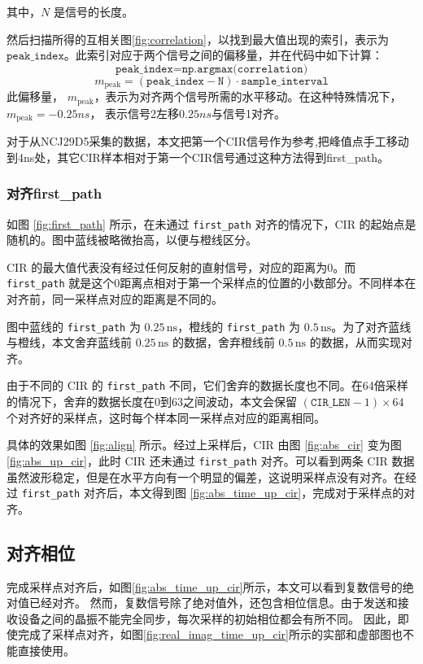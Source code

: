 其中，\( N \) 是信号的长度。

然后扫描所得的互相关图\ref{fig:correlation}，以找到最大值出现的索引，表示为 \( \texttt{peak\_index} \)。此索引对应于两个信号之间的偏移量，并在代码中如下计算：
\[
\texttt{peak\_index} = \texttt{np.argmax(correlation)}
\]
\[
m_{\text{peak}}  = (\texttt{peak\_index} - \texttt{N}) \cdot \texttt{sample\_interval}
\]
此偏移量， \( m_{\text{peak}} \)，表示为对齐两个信号所需的水平移动。在这种特殊情况下，\( m_{\text{peak}} = -0.25ns \)， 表示信号2左移\(0.25ns\)与信号1对齐。

对于从NCJ29D5采集的数据，本文把第一个CIR信号作为参考,把峰值点手工移动到4ns处，其它CIR样本相对于第一个CIR信号通过这种方法得到first\_path。


\subsubsection{对齐first\_path}
如图 \ref{fig:first_path} 所示，在未通过 \texttt{first\_path} 对齐的情况下，CIR 的起始点是随机的。图中蓝线被略微抬高，以便与橙线区分。

CIR 的最大值代表没有经过任何反射的直射信号，对应的距离为0。而 \texttt{first\_path} 就是这个0距离点相对于第一个采样点的位置的小数部分。不同样本在对齐前，同一采样点对应的距离是不同的。

图中蓝线的 \texttt{first\_path} 为 \(0.25\, \text{ns}\)，橙线的 \texttt{first\_path} 为 \(0.5\, \text{ns}\)。为了对齐蓝线与橙线，本文舍弃蓝线前 \(0.25\, \text{ns}\) 的数据，舍弃橙线前 \(0.5\, \text{ns}\) 的数据，从而实现对齐。

由于不同的 CIR 的 \texttt{first\_path} 不同，它们舍弃的数据长度也不同。在64倍采样的情况下，舍弃的数据长度在0到63之间波动，本文会保留 \((\texttt{CIR\_LEN}-1) \times 64\) 个对齐好的采样点，这时每个样本同一采样点对应的距离相同。

具体的效果如图 \ref{fig:align} 所示。经过上采样后，CIR 由图 \ref{fig:abs_cir} 变为图 \ref{fig:abs_up_cir}，此时 CIR 还未通过 \texttt{first\_path} 对齐。可以看到两条 CIR 数据虽然波形稳定，但是在水平方向有一个明显的偏差，这说明采样点没有对齐。在经过 \texttt{first\_path} 对齐后，本文得到图 \ref{fig:abs_time_up_cir}，完成对于采样点的对齐。

\subsection{对齐相位}
完成采样点对齐后，如图\ref{fig:abs_time_up_cir}所示，本文可以看到复数信号的绝对值已经对齐。
然而，复数信号除了绝对值外，还包含相位信息。由于发送和接收设备之间的晶振不能完全同步，每次采样的初始相位都会有所不同。
因此，即使完成了采样点对齐，如图\ref{fig:real_imag_time_up_cir}所示的实部和虚部图也不能直接使用。

